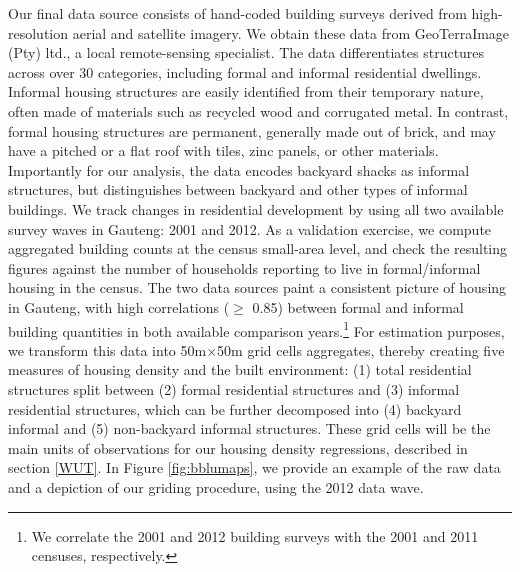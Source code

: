 \documentclass[12pt]{article}
\begin{document}
Our final data source consists of hand-coded building surveys derived from high-resolution aerial and satellite imagery. We obtain these data from GeoTerraImage (Pty) ltd., a local remote-sensing specialist. The data differentiates structures across over 30 categories, including formal and informal residential dwellings. Informal housing structures are easily identified from their temporary nature, often made of materials such as recycled wood and corrugated metal. In contrast, formal housing structures are permanent, generally made out of brick, and may have a pitched or a flat roof with tiles, zinc panels, or other materials. Importantly for our analysis, the data encodes backyard shacks as informal structures, but distinguishes between backyard and other types of informal buildings. We track changes in residential development by using all two available survey waves in Gauteng: 2001 and 2012. As a validation exercise, we compute aggregated building counts at the census small-area level, and check the resulting figures against the number of households reporting to live in formal/informal housing in the census. The two data sources paint a consistent picture of housing in Gauteng, with high correlations ($\geq$ 0.85) between formal and informal building quantities in both available comparison years.\footnote{We correlate the 2001 and 2012 building surveys with the 2001 and 2011 censuses, respectively.} For estimation purposes, we transform this data into 50m$\times$50m grid cells aggregates, thereby creating five measures of housing density and the built environment: (1) total residential structures split between (2) formal residential structures and (3) informal residential structures, which can be further decomposed into (4) backyard informal and (5) non-backyard informal structures.  These grid cells will be the main units of observations for our housing density regressions, described in section \ref{WUT}. In Figure \ref{fig:bblumaps}, we provide an example of the raw data and a depiction of our griding procedure, using the 2012 data wave.




\end{document}
